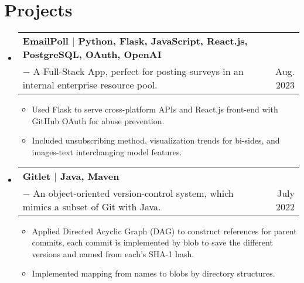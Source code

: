 \documentclass[letterpaper,10pt]{article}
\makeatletter
\newcommand{\skill}[1]{\small{\textnormal{$|$ {#1}}}}
\newcommand{\resumeItem}[1]{
  \item\small{
    {#1 \vspace{-2pt}}
  }
}
\newcommand{\resumeProjectHeading}[3]{
    \item
    \begin{tabular*}{0.97\textwidth}{l@{\extracolsep{\fill}}r}
      \textbf{#1} \\
      \small#2 & \small #3 \\
    \end{tabular*}\vspace{-7pt}
}
\newcommand{\resumeSubHeadingListStart}{\begin{itemize}[leftmargin=0.15in, label={}]}
\newcommand{\resumeSubHeadingListEnd}{\end{itemize}}
\newcommand{\resumeItemListStart}{\begin{itemize}}
\newcommand{\resumeItemListEnd}{\end{itemize}\vspace{-5pt}}
\makeatother
\begin{document}
          
          
\section{Projects}
    \resumeSubHeadingListStart

      \resumeProjectHeading
          {\textbf{EmailPoll} \skill{Python, Flask, JavaScript, React.js, PostgreSQL, OAuth, OpenAI}}
          {$-$ A Full-Stack App, perfect for posting surveys in an internal enterprise resource pool.}
          {Aug. 2023}
          \resumeItemListStart
            \resumeItem{Used Flask to serve cross-platform APIs and React.js front-end with GitHub OAuth for abuse prevention.}
            \resumeItem{Included unsubscribing method, visualization trends for bi-sides, and images-text interchanging model features.}
          \resumeItemListEnd
          
      \resumeProjectHeading
          {\textbf{Gitlet} \skill{Java, Maven}}
          {$-$ An object-oriented version-control system, which mimics a subset of Git with Java.}
          {July 2022}
          \resumeItemListStart
            \resumeItem{Applied Directed Acyclic Graph (DAG) to construct references for parent commits, each commit is implemented by blob to save the different versions and named from each's SHA-1 hash.}
            \resumeItem{Implemented mapping from names to blobs by directory structures.}
          \resumeItemListEnd
    \resumeSubHeadingListEnd


%

\end{document}
